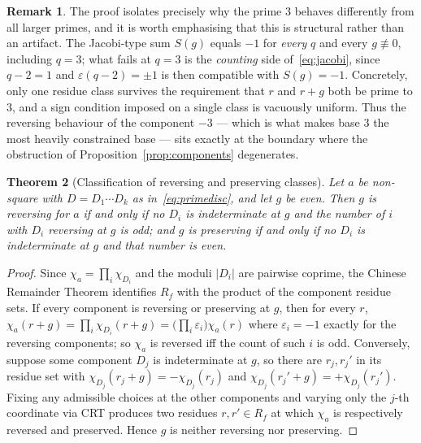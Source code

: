 \documentclass[11pt,reqno]{amsart}
\theoremstyle{plain}
\newtheorem{theorem}{Theorem}
\theoremstyle{definition}
\newtheorem{remark}[theorem]{Remark}
\begin{document}
\begin{remark}
\label{rem:three}
The proof isolates precisely why the prime $3$ behaves differently from all
larger primes, and it is worth emphasising that this is structural rather than
an artifact. The Jacobi-type sum $S(g)$ equals $-1$ for \emph{every} $q$ and
every $g \not\equiv 0$, including $q = 3$; what fails at $q = 3$ is the
\emph{counting} side of~\eqref{eq:jacobi}, since $q - 2 = 1$ and
$\varepsilon(q-2) = \pm 1$ is then compatible with $S(g) = -1$. Concretely,
only one residue class survives the requirement that $r$ and $r+g$ both be
prime to $3$, and a sign condition imposed on a single class is vacuously
uniform. Thus the reversing behaviour of the component $-3$ --- which is what
makes base $3$ the most heavily constrained base --- sits exactly at the
boundary where the obstruction of Proposition~\ref{prop:components}
degenerates.
\end{remark}

\begin{theorem}[Classification of reversing and preserving classes]
\label{thm:classification}
Let $a$ be non-square with $D = D_1 \cdots D_k$ as in~\eqref{eq:primedisc}, and
let $g$ be even. Then $g$ is reversing for $a$ if and only if no $D_i$ is
indeterminate at $g$ and the number of $i$ with $D_i$ reversing at $g$ is odd;
and $g$ is preserving if and only if no $D_i$ is indeterminate at $g$ and that
number is even.
\end{theorem}

\begin{proof}
Since $\chi_a = \prod_i \chi_{D_i}$ and the moduli $|D_i|$ are pairwise
coprime, the Chinese Remainder Theorem identifies $R_f$ with the product of the
component residue sets. If every component is reversing or preserving at $g$,
then for every $r$,
$\chi_a(r+g) = \prod_i \chi_{D_i}(r+g) = \bigl(\prod_i \varepsilon_i\bigr)\chi_a(r)$
where $\varepsilon_i = -1$ exactly for the reversing components; so $\chi_a$ is
reversed iff the count of such $i$ is odd. Conversely, suppose some component
$D_j$ is indeterminate at $g$, so there are $r_j, r_j'$ in its residue set with
$\chi_{D_j}(r_j + g) = -\chi_{D_j}(r_j)$ and
$\chi_{D_j}(r_j' + g) = +\chi_{D_j}(r_j')$. Fixing any admissible choices at
the other components and varying only the $j$-th coordinate via CRT produces
two residues $r, r' \in R_f$ at which $\chi_a$ is respectively reversed and
preserved. Hence $g$ is neither reversing nor preserving.
\end{proof}
\end{document}

